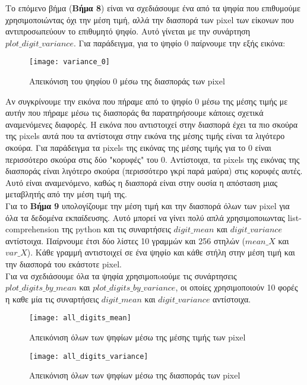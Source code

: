 \documentclass[11pt]{article} %
\begin{document}
Το επόμενο βήμα (\textbf{Βήμα 8}) είναι να σχεδιάσουμε ένα από τα ψηφία που επιθυμούμε χρησιμοποιώντας όχι την μέση τιμή, αλλά την διασπορά των pixel των είκονων που αντιπροσωπεύουν το επιθυμητό ψηφίο. Αυτό γίνεται με την συνάρτηση $plot\_digit\_variance$. Για παράδειγμα, για το ψηφίο $0$ παίρνουμε την εξής εικόνα:

\begin{figure}[H]
    \centering
    \texttt{[image: variance\_0]}
    \caption{Απεικόνιση του ψηφίου $0$ μέσω της διασποράς των pixel}
    \label{fig:var_0}
\end{figure}



Αν συγκρίνουμε την εικόνα που πήραμε από το ψηφίο 0 μέσω της μέσης τιμής με αυτήν που πήραμε μέσω τις διασποράς θα παρατηρήσουμε κάποιες σχετικά αναμενόμενες διαφορές. Η εικόνα που αντιστοιχεί στην διασπορά έχει τα πιο σκούρα της pixels αυτά που τα αντίστοιχα στην εικόνα της μέσης τιμής είναι τα λιγότερο σκούρα. Για παράδειγμα τα pixels της εικόνας της μέσης τιμής για το $0$ είναι περισσότερο σκούρα στις δύο "κορυφές" του $0$. Αντίστοιχα, τα pixels της εικόνας της διασποράς είναι λιγότερο σκούρα (περισσότερο γκρί παρά μαύρα) στις κορυφές αυτές. Αυτό είναι αναμενόμενο, καθώς η διασπορά είναι στην ουσία η απόσταση μιας μεταβλητής από την μέση τιμή της. \\

Για το \textbf{Βήμα 9} υπολογίζουμε την μέση τιμή και την διασπορά όλων των pixel για όλα τα δεδομένα εκπαίδευσης. Αυτό μπορεί να γίνει πολύ απλά χρησιμοποιωντας list-comprehension της python και τις συναρτήσεις $digit\_mean$ και $digit\_variance$ αντίστοιχα. Παίρνουμε έτσι δύο λίστες 10 γραμμών και 256 στηλών ($mean\_X$ και $var\_X$). Κάθε γραμμή αντιστοιχεί σε ένα ψηφίο και κάθε στήλη στην μέση τιμή και την διασπορά του εκάστοτε pixel. \\

Για να σχεδιάσουμε όλα τα ψηφία χρησιμοπoιούμε τις συνάρτησεις  $plot\_digits\_by\_mean$ και $plot\_digits\_by\_variance$, οι οποίες χρησιμοποιούν 10 φορές η καθε μία τις συναρτήσεις $digit\_mean$ και $digit\_variance$ αντίστοιχα. 

\begin{figure}[H]
    \centering
    \texttt{[image: all\_digits\_mean]}
    \caption{Απεικόνιση όλων των ψηφίων μέσω της μέσης τιμής των pixel}
    \label{fig:all_mean}
\end{figure}

\begin{figure}[H]
    \centering
    \texttt{[image: all\_digits\_variance]}
    \caption{Απεικόνιση όλων των ψηφίων μέσω της διασποράς των pixel}
    \label{fig:all_mean}
\end{figure}
\end{document}
